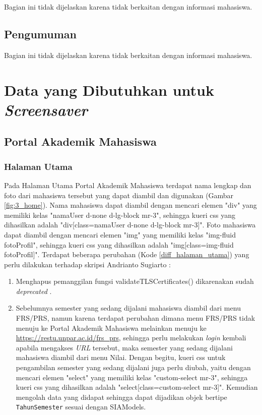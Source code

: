 Bagian ini tidak dijelaskan karena tidak berkaitan dengan informasi mahasiswa.

\subsection{Pengumuman}

Bagian ini tidak dijelaskan karena tidak berkaitan dengan informasi mahasiswa.

\section{Data yang Dibutuhkan untuk \textit{Screensaver}}

\subsection{Portal Akademik Mahasiswa}

\subsubsection{Halaman Utama}
Pada Halaman Utama Portal Akademik Mahasiswa terdapat nama lengkap dan foto dari mahasiswa tersebut yang dapat diambil dan digunakan (Gambar \ref{fig:3_home}). Nama mahasiswa dapat diambil dengan mencari elemen "div" yang memiliki kelas "namaUser d-none d-lg-block mr-3", sehingga kueri css yang dihasilkan adalah "div[class=namaUser d-none d-lg-block mr-3]". Foto mahasiswa dapat diambil dengan mencari elemen "img" yang memiliki kelas "img-fluid fotoProfil", sehingga kueri css yang dihasilkan adalah "img[class=img-fluid fotoProfil]".
Terdapat beberapa perubahan (Kode \ref{diff_halaman_utama}) yang perlu dilakukan terhadap skripsi Andrianto Sugiarto \cite{ifstupor}: 

\begin{enumerate}
    \item Menghapus pemanggilan fungsi validateTLSCertificates() dikarenakan sudah \textit{deprecated} \cite{jsoup}.
    \item Sebelumnya semester yang sedang dijalani mahasiswa diambil dari menu FRS/PRS, namun karena terdapat perubahan dimana menu FRS/PRS tidak menuju ke Portal Akademik Mahasiswa melainkan menuju ke \url{https://restu.unpar.ac.id/frs_prs}, sehingga perlu melakukan \textit{login} kembali apabila mengakses \textit{URL} tersebut, maka semester yang sedang dijalani mahasiswa diambil dari menu Nilai. Dengan begitu, kueri css untuk pengambilan semester yang sedang dijalani juga perlu diubah, yaitu dengan mencari elemen "select" yang memiliki kelas "custom-select mr-3", sehingga kueri css yang dihasilkan adalah "select[class=custom-select mr-3]". Kemudian mengolah data yang didapat sehingga dapat dijadikan objek bertipe \texttt{TahunSemester} sesuai dengan SIAModels.
\end{enumerate}

